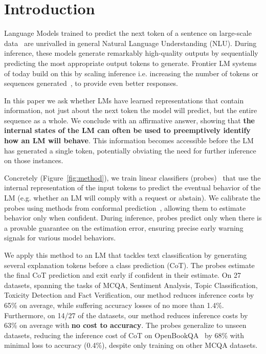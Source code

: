 \section{Introduction}
\label{sec:introduction}
Language Models trained to predict the next token of a sentence on large-scale data~\citep{sutskever2014sequence, devlin-etal-2019-bert} are unrivalled in general Natural Language Understanding (NLU). During inference, these models generate remarkably high-quality outputs by sequentially predicting the most appropriate output tokens to generate. Frontier LM systems of today build on this by scaling inference i.e. increasing the number of tokens or sequences generated~\citep{wei2022chain, yao2023tree, OpenAIO1, guo2025deepseek}, to provide even better responses. 

In this paper we ask whether LMs have learned representations that contain information, not just about the next token the model will predict, but the entire sequence as a whole. We conclude with an affirmative answer, showing that \textbf{the internal states of the LM can often be used to preemptively identify how an LM will behave}. This information becomes accessible before the LM has generated a single token, potentially obviating the need for further inference on those instances. 

Concretely (Figure~\ref{fig:method}), we train linear classifiers (probes)~\citep{alain2017understanding} that use the internal representation of the input tokens to predict the eventual behavior of the LM (e.g. whether an LM will comply with a request or abstain). We calibrate the probes using methods from conformal prediction~\citep{shafer2008tutorial}, allowing them to estimate behavior only when confident. During inference, probes predict only when there is a provable guarantee on the estimation error, ensuring precise early warning signals for various model behaviors. 


We apply this method to an LM that tackles text classification by generating several explanation tokens before a class prediction (CoT). The probes estimate the final CoT prediction and exit early if confident in their estimate. On 27 datasets, spanning the tasks of MCQA, Sentiment Analysis, Topic Classification, Toxicity Detection and Fact Verification, our method reduces inference costs by 65\% on average, while suffering accuracy losses of no more than 1.4\%. Furthermore, on 14/27 of the datasets, our method reduces inference costs by 63\% on average with \textbf{no cost to accuracy}. The probes generalize to unseen datasets, reducing the inference cost of CoT on OpenBookQA~\citep{mihaylov2018can} by 68\% with minimal loss to accuracy (0.4\%), despite only training on other MCQA datasets. 

